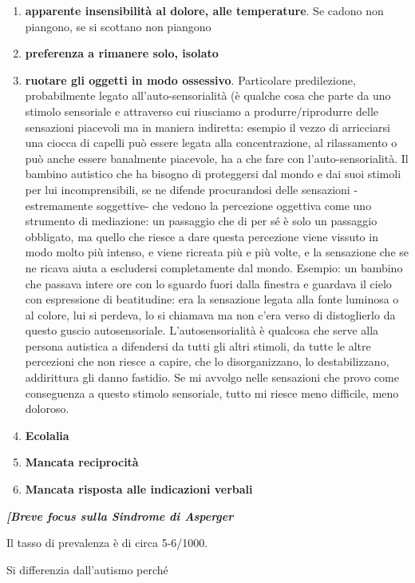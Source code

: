 \documentclass[]{article}
\begin{document}
\begin{enumerate}
\def\labelenumi{\arabic{enumi}.}
\item
  \textbf{apparente insensibilità al dolore, alle temperature}. Se
  cadono non piangono, se si scottano non piangono
\item
  \textbf{preferenza a rimanere solo, isolato}
\item
  \textbf{ruotare gli oggetti in modo ossessivo}. Particolare
  predilezione, probabilmente legato all'auto-sensorialità (è qualche
  cosa che parte da uno stimolo sensoriale e attraverso cui riusciamo a
  produrre/riprodurre delle sensazioni piacevoli ma in maniera
  indiretta: esempio il vezzo di arricciarsi una ciocca di capelli può
  essere legata alla concentrazione, al rilassamento o può anche essere
  banalmente piacevole, ha a che fare con l'auto-sensorialità. Il
  bambino autistico che ha bisogno di proteggersi dal mondo e dai suoi
  stimoli per lui incomprensibili, se ne difende procurandosi delle
  sensazioni -estremamente soggettive- che vedono la percezione
  oggettiva come uno strumento di mediazione: un passaggio che di per sé
  è solo un passaggio obbligato, ma quello che riesce a dare questa
  percezione viene vissuto in modo molto più intenso, e viene ricreata
  più e più volte, e la sensazione che se ne ricava aiuta a escludersi
  completamente dal mondo. Esempio: un bambino che passava intere ore
  con lo sguardo fuori dalla finestra e guardava il cielo con
  espressione di beatitudine: era la sensazione legata alla fonte
  luminosa o al colore, lui si perdeva, lo si chiamava ma non c'era
  verso di distoglierlo da questo guscio autosensoriale.
  L'autosensorialità è qualcosa che serve alla persona autistica a
  difendersi da tutti gli altri stimoli, da tutte le altre percezioni
  che non riesce a capire, che lo disorganizzano, lo destabilizzano,
  addirittura gli danno fastidio. Se mi avvolgo nelle sensazioni che
  provo come conseguenza a questo stimolo sensoriale, tutto mi riesce
  meno difficile, meno doloroso.
\item
  \textbf{Ecolalia}
\item
  \textbf{Mancata reciprocità}
\item
  \textbf{Mancata risposta alle indicazioni verbali}
\end{enumerate}

\emph{\textbf{{[}Breve focus sulla Sindrome di Asperger}}

Il tasso di prevalenza è di circa 5-6/1000.

Si differenzia dall'autismo perché
\end{document}
